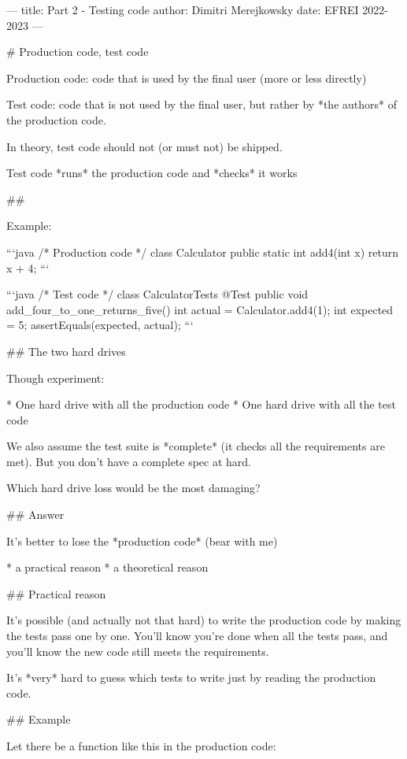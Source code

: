 ---
title: Part 2 - Testing code
author: Dimitri Merejkowsky
date: EFREI 2022-2023
---

# Production code, test code

Production code: code that is used by the final user (more or less directly)

\vfill

Test code: code that is not used by the final user, but rather by *the authors*
of the production code.

In theory, test code should not (or must not) be shipped.

Test code *runs* the production code and *checks* it works

##

Example:

```java
/* Production code */
class Calculator {
    public static int add4(int x) {
        return x + 4;
    }
}
```

\vfill


```java
/* Test code */
class CalculatorTests {
    @Test
    public void add_four_to_one_returns_five() {
        int actual = Calculator.add4(1);
        int expected = 5;
        assertEquals(expected, actual);
    }
}
```

## The two hard drives

Though experiment:

* One hard drive with all the production code
* One hard drive with all the test code

We also assume the test suite is *complete* (it
checks all the requirements are met). But you don't
have a complete spec at hard.

Which hard drive loss would be the most damaging?


## Answer

It's better to lose the *production code* (bear with me)

\vfill


* a practical reason
* a theoretical reason

## Practical reason

It's possible (and actually not that hard) to write the production code
by making the tests pass one by one. You'll know you're done when all
the tests pass, and you'll know the new code still meets the
requirements.

It's *very* hard to guess which tests to write just by reading the production code.

## Example

Let there be a function like this in the production code:

